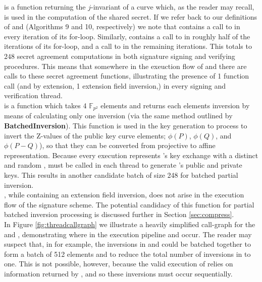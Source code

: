 \noindent
{} is a function returning the $j$-invariant of a curve which, as the reader may recall, is used in the computation of the shared secret. If we refer back to our definitions of  and  (Algorithms 9 and 10, respectively) we note that  contains a call to  in every iteration of its for-loop. Similarly,  contains a call to  in roughly half of the iterations of its for-loop, and a call to  in the remaining iterations. This totals to $248$ secret agreement computations in both signature signing and verifying procedures. This means that somewhere in the exeuction flow of  and  there are calls to these secret agreement functions, illustrating the presence of 1  function call (and by extension, 1 extension field inversion,) in every signing and verification thread.\\

\noindent
{} is a function which takes 4 $\mathbb{F}_{p^2}$ elements and returns each elements inversion by means of calculating only one inversion (via the same method outlined by \textbf{BatchedInversion}). This function is used in the key generation to process to invert the Z-values of the public key curve elements; $\phi(P)$, $\phi(Q)$, and $\phi(P-Q)$), so that they can be converted from projective to affine representation. Because every  execution represents \bob's key exchange with a distinct and random \randall,  must be called in each thread to generate \randall's public and private keys. This results in another candidate batch of size 248 for batched partial inversion.\\

\noindent
{}, while containing an extension field inversion, does not arise in the execution flow of the signature scheme. The potential candidacy of this function for partial batched inversion processing is discussed further in Section \ref{sec:compress}.\\

In Figure \ref{fig:threadcallgraph} we illustrate a heavily simplified call-graph for the  and , demonstrating where in the execution pipeline  and  occur. The reader may suspect that, in  for example, the inversions in  and  could be batched together to form a batch of 512 elements and to reduce the total number of inversions in  to one. This is not possible, however, because the valid execution of  relies on information returned by , and so these inversions must occur sequentially. 

